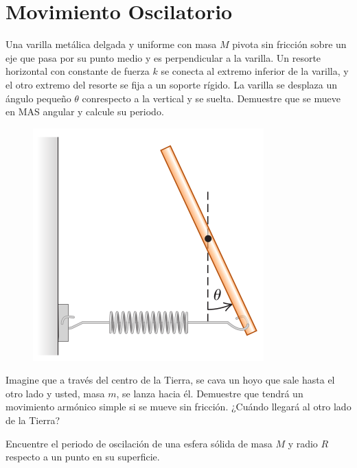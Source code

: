 \section*{Movimiento Oscilatorio}

\begin{ejercicio}
		Una varilla metálica delgada y uniforme con masa $M$ pivota sin fricción sobre un eje que pasa por su punto medio y es perpendicular a la varilla. Un resorte horizontal con constante de fuerza $k$ se conecta al extremo inferior de la varilla, y el otro extremo del resorte se fija a un soporte rígido. La varilla se desplaza un ángulo pequeño $\theta$ conrespecto a la vertical y se suelta. Demuestre que se mueve en MAS angular y calcule su periodo.
		
		\begin{figure}[H]
			\centering
			\includegraphics[scale=0.3]{./img/ej1.png}
		\end{figure}
	\end{ejercicio}




\begin{ejercicio}
		Imagine que a través del centro de la Tierra, se cava un hoyo que sale hasta el otro lado y usted, masa $m$, se lanza hacia él. Demuestre que tendrá un movimiento armónico simple si se mueve sin fricción. ¿Cuándo llegará al otro lado de la Tierra?
	\end{ejercicio}




\begin{ejercicio}
	Encuentre el periodo de oscilación de una esfera sólida de masa $M$ y radio $R$ respecto a un punto en su superficie.
\end{ejercicio}






